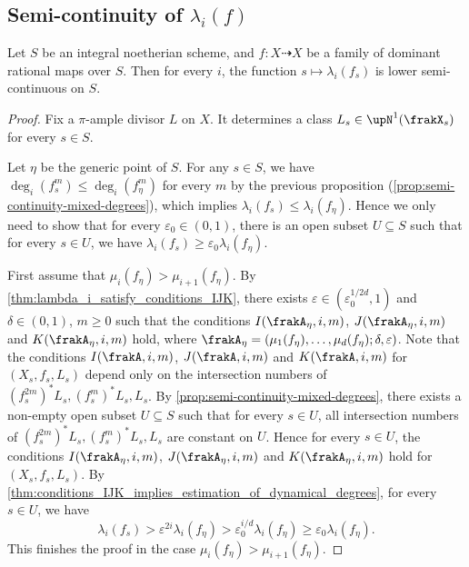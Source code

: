 \subsection[Semi-continuity of dynamical degree]{Semi-continuity of $\lambda_i(f)$}

  \begin{theorem}\label{thm:semi-continuity-of-dynamical-degrees}
    Let $S$ be an integral noetherian scheme, and $f: X \dashrightarrow X$ be a family of dominant rational maps over $S$.
    Then for every $i$, the function $s \mapsto \lambda_i(f_s)$ is lower semi-continuous on $S$.
  \end{theorem}
  \begin{proof}
    Fix a $\pi$-ample divisor $L$ on $X$.
    It determines a class $L_s \in \upN^1(\frakX_s)$ for every $s \in S$.

    Let $\eta$ be the generic point of $S$.
    For any $s \in S$, we have $\deg_i(f_s^m) \leq \deg_i(f_\eta^m)$ for every $m$ by the previous proposition (\cref{prop:semi-continuity-mixed-degrees}), which implies $\lambda_i(f_s) \leq \lambda_i(f_\eta)$.
    Hence we only need to show that for every $\varepsilon_0 \in (0,1)$, there is an open subset $U \subseteq S$ such that for every $s \in U$, we have $\lambda_i(f_s) \geq \varepsilon_0 \lambda_i(f_\eta)$.

    First assume that $\mu_i(f_\eta) > \mu_{i+1}(f_\eta)$.
    By \cref{thm:lambda_i_satisfy_conditions_IJK}, there exists $\varepsilon \in (\varepsilon_0^{1/{2d}}, 1)$ and $\delta \in (0,1)$, $m \geq 0$ such that the conditions $I(\frakA_\eta, i, m)$, $J(\frakA_\eta, i, m)$ and $K(\frakA_\eta, i, m)$ hold, where $\frakA_\eta = (\mu_1(f_\eta), \ldots, \mu_d(f_\eta); \delta, \varepsilon)$.
    Note that the conditions $I(\frakA, i, m)$, $J(\frakA, i, m)$ and $K(\frakA, i, m)$ for $(X_s, f_s, L_s)$ depend only on the intersection numbers of $(f_s^{2m})^*L_s, (f_s^{m})^*L_s, L_s$.
    By \cref{prop:semi-continuity-mixed-degrees}, there exists a non-empty open subset $U \subseteq S$ such that for every $s \in U$, all intersection numbers of $(f_s^{2m})^*L_s, (f_s^{m})^*L_s, L_s$ are constant on $U$.
    Hence for every $s \in U$, the conditions $I(\frakA_\eta, i, m)$, $J(\frakA_\eta, i, m)$ and $K(\frakA_\eta, i, m)$ hold for $(X_s, f_s, L_s)$.
    By \cref{thm:conditions_IJK_implies_estimation_of_dynamical_degrees}, for every $s \in U$, we have 
    \[ \lambda_i(f_s) > \varepsilon^{2i} \lambda_i(f_\eta) > \varepsilon_0^{i/d} \lambda_i(f_\eta) \geq \varepsilon_0 \lambda_i(f_\eta). \]
    This finishes the proof in the case $\mu_i(f_\eta) > \mu_{i+1}(f_\eta)$.


\end{proof}
